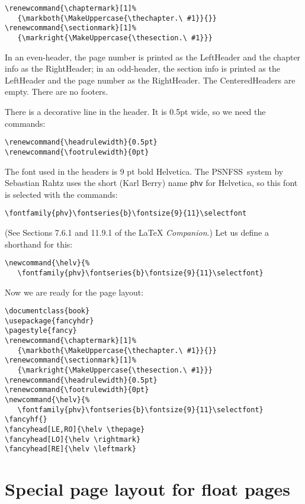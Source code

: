 \documentclass[a4paper]{article}
\def\latex/{\protect\LaTeX{}}
\newcommand{\PSNFSS}{{\sf
    PSNFSS}}
\begin{document}
\begin{verbatim}
\renewcommand{\chaptermark}[1]%
   {\markboth{\MakeUppercase{\thechapter.\ #1}}{}}
\renewcommand{\sectionmark}[1]%
   {\markright{\MakeUppercase{\thesection.\ #1}}}
\end{verbatim}

In an even-header, the page number is printed as the LeftHeader and
the chapter info as the RightHeader; in an odd-header, the section info
is printed as the LeftHeader and the page number as the RightHeader.  The
CenteredHeaders are empty.  There are no footers.

There is a decorative line in the header.  It is 0.5pt wide, so we need
the commands:

\begin{verbatim}
\renewcommand{\headrulewidth}{0.5pt}
\renewcommand{\footrulewidth}{0pt}
\end{verbatim}

The font used in the headers is 9 pt bold Helvetica.  The \PSNFSS\ system
by Sebastian Rahtz uses the short (Karl Berry) name \verb|phv| for
Helvetica, so this font is selected with the commands:
\begin{verbatim}
\fontfamily{phv}\fontseries{b}\fontsize{9}{11}\selectfont
\end{verbatim}
(See Sections 7.6.1 and 11.9.1 of the \latex/ \emph{Companion}.)
Let us define a shorthand for this:
\begin{verbatim}
\newcommand{\helv}{%
   \fontfamily{phv}\fontseries{b}\fontsize{9}{11}\selectfont}
\end{verbatim}

Now we are ready for the page layout:

\begin{verbatim}
\documentclass{book}
\usepackage{fancyhdr}
\pagestyle{fancy}
\renewcommand{\chaptermark}[1]%
   {\markboth{\MakeUppercase{\thechapter.\ #1}}{}}
\renewcommand{\sectionmark}[1]%
   {\markright{\MakeUppercase{\thesection.\ #1}}}
\renewcommand{\headrulewidth}{0.5pt}
\renewcommand{\footrulewidth}{0pt}
\newcommand{\helv}{%
   \fontfamily{phv}\fontseries{b}\fontsize{9}{11}\selectfont}
\fancyhf{}
\fancyhead[LE,RO]{\helv \thepage}
\fancyhead[LO]{\helv \rightmark}
\fancyhead[RE]{\helv \leftmark}
\end{verbatim}


\section{Special page layout for float pages}
\label{sec:float}
\end{document}

